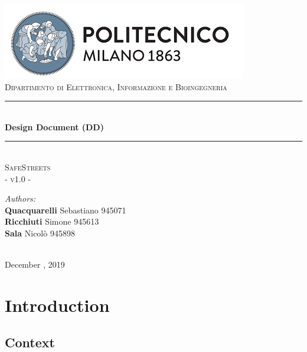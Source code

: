 \documentclass{article}
\begin{document}
	\begin{titlepage}
		
		\centering
		\vspace*{0.7 cm}
		\includegraphics[scale = 0.7]{images/PolimiLogo.png}\\[1 cm]
		\textsc{\large Dipartimento di Elettronica, Informazione e Bioingegneria}\\[2 cm]
		
		\rule{\linewidth}{0.2 mm} \\[0.5 cm]
		{\huge \bfseries Design Document (DD)}\\
		\rule{\linewidth}{0.2 mm} \\[1.5 cm]
		
		\textsc{\Large SafeStreets}\\[0.5 cm]
		\textsc{\large - v1.0 -}\\[1 cm]
		
		\begin{minipage}{\textwidth}
			\begin{flushleft} \large
				\emph{Authors:}\\
				\textbf{Quacquarelli} Sebastiano \hfill 945071 \\
				\textbf{Ricchiuti} Simone \hfill 945613  \\
				\textbf{Sala} Nicolò \hfill 945898  \\[2 cm]
			\end{flushleft}
		\end{minipage}\\[2 cm]
		
		{\large December  , 2019}\\[2 cm]
		
	\end{titlepage}
	
	\tableofcontents
	\clearpage
	\newpage
	\setcounter{page}{1}
	
	\section{Introduction}
		\subsection{Context}
\end{document}
